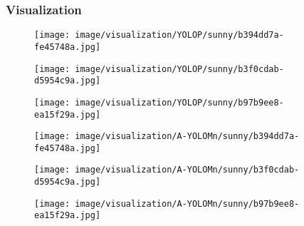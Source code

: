 \documentclass[lettersize,journal]{IEEEtran}
\begin{document}
\subsubsection{Visualization}
\label{subsubsec: Visualization}
\begin{figure*}[!h]
    \centering

\begin{subfigure}[b]{0.05\textwidth}
        \centering
        \vspace{0.6cm} \end{subfigure}\begin{subfigure}{0.25\textwidth}
        \centering
        \texttt{[image: image/visualization/YOLOP/sunny/b394dd7a-fe45748a.jpg]}
    \end{subfigure}\hspace{0.5cm}
    \begin{subfigure}{0.25\textwidth}
        \centering
        \texttt{[image: image/visualization/YOLOP/sunny/b3f0cdab-d5954c9a.jpg]}
    \end{subfigure}\hspace{0.5cm}
    \begin{subfigure}{0.25\textwidth}
        \centering
        \texttt{[image: image/visualization/YOLOP/sunny/b97b9ee8-ea15f29a.jpg]}
    \end{subfigure}

    \medskip

\begin{subfigure}[b]{0.05\textwidth}
        \centering
        \vspace{0.2cm}
    \end{subfigure}\begin{subfigure}{0.25\textwidth}
        \centering
        \texttt{[image: image/visualization/A-YOLOMn/sunny/b394dd7a-fe45748a.jpg]}
    \end{subfigure}\hspace{0.5cm}
    \begin{subfigure}{0.25\textwidth}
        \centering
        \texttt{[image: image/visualization/A-YOLOMn/sunny/b3f0cdab-d5954c9a.jpg]}
    \end{subfigure}\hspace{0.5cm}
    \begin{subfigure}{0.25\textwidth}
        \centering
        \texttt{[image: image/visualization/A-YOLOMn/sunny/b97b9ee8-ea15f29a.jpg]}
    \end{subfigure}


\end{figure*}
\end{document}
